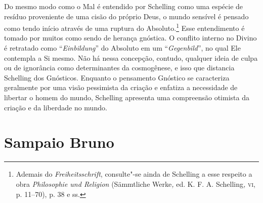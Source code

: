 Do mesmo modo como o Mal é entendido por Schelling como uma
espécie de resíduo proveniente de uma cisão do próprio Deus, o
mundo sensível é pensado como tendo início através de uma
ruptura do Absoluto.\footnote{ Ademais do
\emph{Freiheitsschrift}, consulte"-se ainda de Schelling a esse
respeito a obra \emph{Philosophie und Religion} (Sämmtliche
Werke\emph{,} ed. K. F. A. Schelling\emph{,} \textsc{vi}, p. 11--70),
p. 38 e ss.} Esse entendimento é tomado por muitos como sendo
de herança gnóstica. O conflito interno no Divino é retratado
como “\emph{Einbildung}” do Absoluto em um
“\emph{Gegenbild}”, no qual Ele contempla a Si mesmo. Não há
nessa concepção, contudo, qualquer ideia de culpa ou de
ignorância como determinantes da cosmogênese, e isso que
distancia Schelling dos Gnósticos. Enquanto o pensamento
Gnóstico se caracteriza geralmente por uma visão pessimista da
criação e enfatiza a necessidade de libertar o homem do mundo,
Schelling apresenta uma compreensão otimista da criação e da
liberdade no mundo.

\section{Sampaio Bruno}

